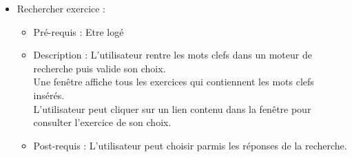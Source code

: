 \begin{itemize}
\begin{itemize}
		\item Supprimer exercice :
			\begin{itemize}
			\item Pr{\'e}-requis : Etre log{\'e}/identifi{\'e}.\\
			L'exercice que l'utilisateur veut supprimer existe.	
			\item Description : L'utilisateur choisit un exercice.\\
			Il clique l'option {\it Suppression}\\
			Une fen{\^e}tre de confirmation apparait.\\
			L'utilisateur confirme son choix.\\
			L'exercice disparait des Tds auxquels il appartenait et est d{\'e}plac{\'e} dans le r{\'e}p{\'e}rtoire d'archives.
			\item Post-requis : L'exercice est supprim{\'e} des Tds et des projets et de la base des exercices.
			\end{itemize}

		\item Lister exercices :
			\begin{itemize}
			\item Pr{\'e}-requis : Etre log{\'e}
			\item Description : L'utilisateur choisit un enseignement\\
			L'utilisateur demande le listing des exercices par un simple clique.
			\item Post-requis : La liste des exercices pour un enseignement donn{\'e} est affich{\'e}.
			\end{itemize}
		\end{itemize}


		\item Rechercher exercice :
			\begin{itemize}
			\item Pr{\'e}-requis : Etre log{\'e}
			\item Description : L'utilisateur rentre les mots clefs dans un moteur de recherche puis valide son choix.\\
			Une fen{\^e}tre affiche tous les exercices qui contiennent les mots clefs ins{\'e}r{\'e}s.\\
			L'utilisateur peut cliquer sur un lien contenu dans la fen{\^e}tre pour consulter l'exercice de son choix.
			\item Post-requis : L'utilisateur peut choisir parmis les r{\'e}ponses de la recherche.
			\end{itemize}


\end{itemize}
